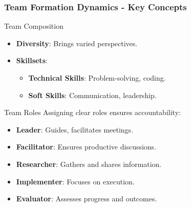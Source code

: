 \documentclass[aspectratio=169]{beamer}
\begin{document}
\begin{frame}[fragile]
    \frametitle{Team Formation Dynamics - Key Concepts}
    \begin{block}{Team Composition}
        \begin{itemize}
            \item \textbf{Diversity}: Brings varied perspectives.
            \item \textbf{Skillsets}: 
                \begin{itemize}
                    \item \textbf{Technical Skills}: Problem-solving, coding.
                    \item \textbf{Soft Skills}: Communication, leadership.
                \end{itemize}
        \end{itemize}
    \end{block}
    
    \begin{block}{Team Roles}
        Assigning clear roles ensures accountability:
        \begin{itemize}
            \item \textbf{Leader}: Guides, facilitates meetings.
            \item \textbf{Facilitator}: Ensures productive discussions.
            \item \textbf{Researcher}: Gathers and shares information.
            \item \textbf{Implementer}: Focuses on execution.
            \item \textbf{Evaluator}: Assesses progress and outcomes.
        \end{itemize}
    \end{block}
\end{frame}
\end{document}
